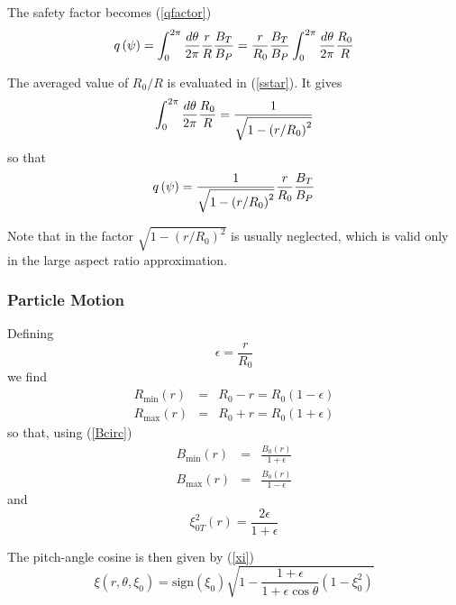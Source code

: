 \documentclass{article}
\begin{document}
The safety factor becomes (\ref{qfactor})
\begin{equation}
q\left( \psi \right) =\int_{0}^{2\pi }\frac{d\theta }{2\pi }\frac{r}{R}\frac{%
B_{T}}{B_{P}}=\frac{r}{R_{0}}\frac{B_{T}}{B_{P}}\int_{0}^{2\pi }\frac{%
d\theta }{2\pi }\frac{R_{0}}{R}
\end{equation}

The averaged value of $R_{0}/R$ is evaluated in (\ref{sstar}). It gives
\begin{equation}
\int_{0}^{2\pi }\frac{d\theta }{2\pi }\frac{R_{0}}{R}=\frac{1}{\sqrt{%
1-\left( r/R_{0}\right) ^{2}}}
\end{equation}
so that
\begin{equation}
q\left( \psi \right) =\frac{1}{\sqrt{1-\left( r/R_{0}\right) ^{2}}}\frac{r}{%
R_{0}}\frac{B_{T}}{B_{P}}
\end{equation}

Note that in the factor $\sqrt{1-\left( r/R_{0}\right) ^{2}}$ is usually
neglected, which is valid only in the large aspect ratio approximation.

\subsubsection{Particle Motion}

Defining 
\begin{equation}
\epsilon =\frac{r}{R_{0}}
\end{equation}
we find 
\begin{eqnarray}
R_{\min }\left( r\right)  &=&R_{0}-r=R_{0}\left( 1-\epsilon \right)  \\
R_{\max }\left( r\right)  &=&R_{0}+r=R_{0}\left( 1+\epsilon \right) 
\end{eqnarray}
so that, using (\ref{Bcirc}) 
\begin{eqnarray}
B_{\min }\left( r\right)  &=&\frac{B_{0}\left( r\right) }{1+\epsilon } \\
B_{\max }\left( r\right)  &=&\frac{B_{0}\left( r\right) }{1-\epsilon }
\end{eqnarray}
and 
\begin{equation}
\xi _{0T}^{2}\left( r\right) =\frac{2\epsilon }{1+\epsilon }
\end{equation}

The pitch-angle cosine is then given by (\ref{xi}) 
\begin{equation}
\xi \left( r,\theta ,\xi _{0}\right) =\text{sign}\left( \xi _{0}\right) 
\sqrt{1-\frac{1+\epsilon }{1+\epsilon \cos \theta }\left( 1-\xi
_{0}^{2}\right) }  \label{xicirc}
\end{equation}
\end{document}

